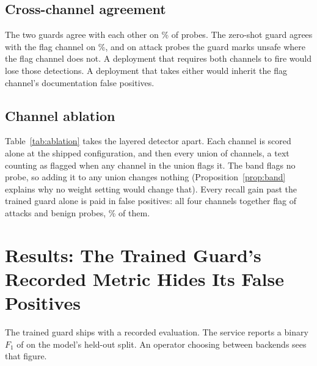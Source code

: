 \documentclass[conference]{IEEEtran}
\begin{document}
\subsection{Cross-channel agreement}

The two guards agree with each other on \GuardPairAgree{}\% of probes. The
zero-shot guard agrees with the flag channel on \GuardFlagAgree{}\%, and on
\NFlagOnlyMiss{} attack probes the guard marks unsafe where the flag channel
does not. A deployment that requires both channels to fire would lose those
detections. A deployment that takes either would inherit the flag channel's
documentation false positives.

\subsection{Channel ablation}\label{sec:ablation}

Table~\ref{tab:ablation} takes the layered detector apart. Each channel is
scored alone at the shipped configuration, and then every union of channels,
a text counting as flagged when any channel in the union flags it. The band
flags no probe, so adding it to any union changes nothing
(Proposition~\ref{prop:band} explains why no weight setting would change
that). Every recall gain past the trained guard alone is paid in false
positives: all four channels together flag \NAblAllTp{} of \NBoundAttack{}
attacks and \NAblAllFp{} benign probes, \AblAllFpr{}\% of them.

\begin{table}[t]
\centering
\caption{Channel ablation of the layered detector at the shipped
configuration. A union flags a text when any of its channels does. Counts
are over \NBoundAttack{} attack and the benign probes of the probe set.}
\label{tab:ablation}
\scriptsize
\setlength{\tabcolsep}{2pt}

\end{table}

\section{Results: The Trained Guard's Recorded Metric Hides Its False Positives}\label{sec:evalgap}

The trained guard ships with a recorded evaluation. The service reports a
binary $F_1$ of \ReportedFOneTr{} on the model's held-out split. An operator
choosing between backends sees that figure.
\end{document}
